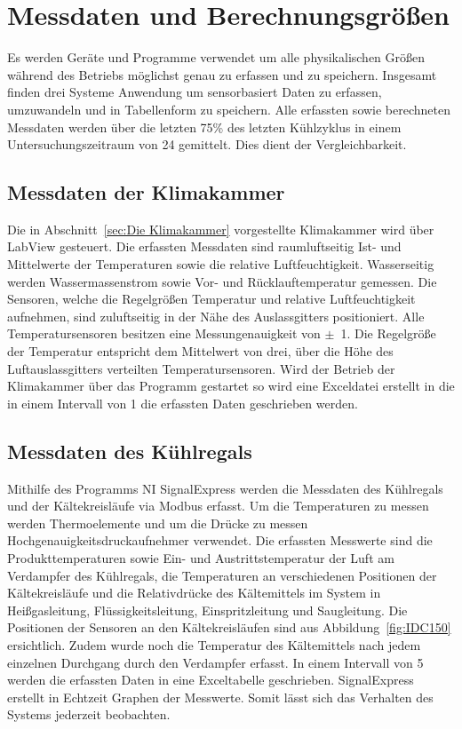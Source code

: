 \section{Messdaten und Berechnungsgrößen}
\label{sec:Erfassung von Messdaten}

Es werden Geräte und Programme verwendet um alle physikalischen Größen während des Betriebs möglichst genau zu erfassen und zu speichern. Insgesamt finden drei Systeme Anwendung um sensorbasiert Daten zu erfassen, umzuwandeln und in Tabellenform zu speichern. Alle erfassten sowie berechneten Messdaten werden über die letzten \unit{75}{\%} des letzten Kühlzyklus in einem Untersuchungszeitraum von \unit{24}{\hour} gemittelt. Dies dient der Vergleichbarkeit.

\subsection{Messdaten der Klimakammer}
\label{subsec:Messdaten der Klimakammer}

Die in Abschnitt~\ref{sec:Die Klimakammer} vorgestellte Klimakammer wird über LabView gesteuert. Die erfassten Messdaten sind raumluftseitig Ist- und Mittelwerte der Temperaturen sowie die relative Luftfeuchtigkeit. Wasserseitig werden Wassermassenstrom sowie Vor- und Rücklauftemperatur gemessen. 
Die Sensoren, welche die Regelgrößen Temperatur und relative Luftfeuchtigkeit aufnehmen, sind zuluftseitig in der Nähe des Auslassgitters positioniert. Alle Temperatursensoren besitzen eine Messungenauigkeit von $\pm$~\unit{1}{\kelvin}. Die Regelgröße der Temperatur entspricht dem Mittelwert von drei, über die Höhe des Luftauslassgitters verteilten Temperatursensoren. Wird der Betrieb der Klimakammer über das Programm gestartet so wird eine Exceldatei erstellt in die in einem Intervall von \unit{1}{\second} die erfassten Daten geschrieben werden.


\subsection{Messdaten des Kühlregals}
\label{subsec:Messdaten der Klimakammer}

Mithilfe des Programms NI SignalExpress werden die Messdaten des Kühlregals und der Kältekreisläufe via Modbus erfasst. Um die Temperaturen zu messen werden Thermoelemente  und um die Drücke zu messen Hochgenauigkeitsdruckaufnehmer verwendet. Die erfassten Messwerte sind die Produkttemperaturen sowie Ein- und Austrittstemperatur der Luft am Verdampfer des Kühlregals, die Temperaturen an verschiedenen Positionen der Kältekreisläufe und die Relativdrücke des Kältemittels im System in Heißgasleitung, Flüssigkeitsleitung, Einspritzleitung und Saugleitung. Die Positionen der Sensoren an den Kältekreisläufen sind aus Abbildung~\ref{fig:IDC150} ersichtlich. Zudem wurde noch die Temperatur des Kältemittels nach jedem einzelnen Durchgang durch den Verdampfer erfasst.
In einem Intervall von \unit{5}{\second} werden die erfassten Daten in eine Exceltabelle geschrieben. SignalExpress erstellt in Echtzeit Graphen der Messwerte. Somit lässt sich das Verhalten des Systems jederzeit beobachten.

